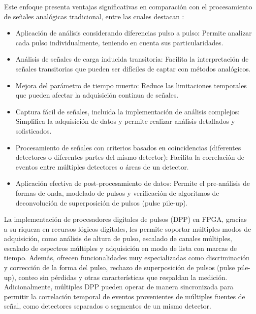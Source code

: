 \documentclass[]{book}
\begin{document}
\noindent Este enfoque presenta ventajas significativas en comparación con el procesamiento de señales analógicas tradicional, entre las cuales destacan \cite{radeka1968optimum}:

\begin{itemize}
    \item Aplicación de análisis considerando diferencias pulso a pulso: Permite analizar cada pulso individualmente, teniendo en cuenta sus particularidades.
    \item Análisis de señales de carga inducida transitoria: Facilita la interpretación de señales transitorias que pueden ser difíciles de captar con métodos analógicos.
    \item  Mejora del parámetro de tiempo muerto: Reduce las limitaciones temporales que pueden afectar la adquisición continua de señales.
    \item Captura fácil de señales, incluida la implementación de análisis complejos: Simplifica la adquisición de datos y permite realizar análisis detallados y sofisticados.
    \item Procesamiento de señales con criterios basados en coincidencias (diferentes detectores o diferentes partes del mismo detector): Facilita la correlación de eventos entre múltiples detectores o áreas de un detector.
    \item Aplicación efectiva de post-procesamiento de datos: Permite el pre-análisis de formas de onda, modelado de pulsos y verificación de algoritmos de deconvolución de superposición de pulsos (pulse pile-up).

\end{itemize}

\noindent La implementación de procesadores digitales de pulsos (DPP) en FPGA, gracias a su riqueza en recursos lógicos digitales, les permite soportar múltiples modos de adquisición, como análisis de altura de pulso, escalado de canales múltiples, escalado de espectros múltiples y adquisición en modo de lista con marcas de tiempo. Además, ofrecen funcionalidades muy especializadas como discriminación y corrección de la forma del pulso, rechazo de superposición de pulsos (pulse pile-up), conteo sin pérdidas y otras características que respaldan la medición. Adicionalmente, múltiples DPP pueden operar de manera sincronizada para permitir la correlación temporal de eventos provenientes de múltiples fuentes de señal, como detectores separados o segmentos de un mismo detector. \\
\end{document}
